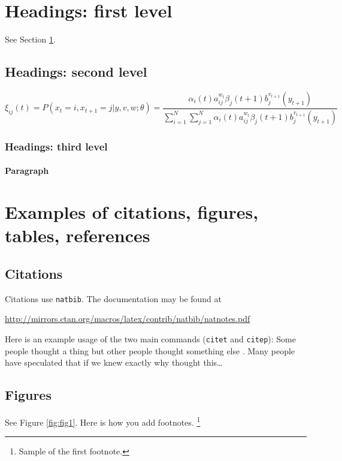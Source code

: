 \documentclass{article}
\begin{document}
\section{Headings: first level}
\label{sec:headings}

\lipsum[4] See Section \ref{sec:headings}.

\subsection{Headings: second level}
\lipsum[5]
\begin{equation}
	\xi _{ij}(t)=P(x_{t}=i,x_{t+1}=j|y,v,w;\theta)= {\frac {\alpha _{i}(t)a^{w_t}_{ij}\beta _{j}(t+1)b^{v_{t+1}}_{j}(y_{t+1})}{\sum _{i=1}^{N} \sum _{j=1}^{N} \alpha _{i}(t)a^{w_t}_{ij}\beta _{j}(t+1)b^{v_{t+1}}_{j}(y_{t+1})}}
\end{equation}

\subsubsection{Headings: third level}
\lipsum[6]

\paragraph{Paragraph}
\lipsum[7]



\section{Examples of citations, figures, tables, references}
\label{sec:others}

\subsection{Citations}
Citations use \verb+natbib+. The documentation may be found at
\begin{center}
	\url{http://mirrors.ctan.org/macros/latex/contrib/natbib/natnotes.pdf}
\end{center}

Here is an example usage of the two main commands (\verb+citet+ and \verb+citep+): Some people thought a thing \citep{kour2014real, hadash2018estimate} but other people thought something else \citep{kour2014fast}. Many people have speculated that if we knew exactly why \citet{kour2014fast} thought this\dots

\subsection{Figures}
\lipsum[10]
See Figure \ref{fig:fig1}. Here is how you add footnotes. \footnote{Sample of the first footnote.}
\lipsum[11]
\end{document}
